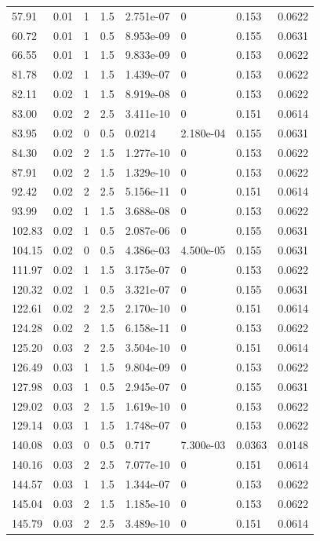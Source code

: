 \documentclass[preview]{standalone}
\begin{document}
{{\begin{tabular}{L{1.2cm}C{1.2cm} C{0.3cm}C{0.5cm} C{1.4cm}C{1.4cm} C{1.4cm}C{1.4cm}}
  57.91  &  0.01  & 1     & 1.5 &  2.751e-07  & 0  & 0.153 &  0.0622   \\ 
  60.72  &  0.01  & 1     & 0.5 &  8.953e-09  & 0  & 0.155 &  0.0631   \\ 
  66.55  &  0.01  & 1     & 1.5 &  9.833e-09  & 0  & 0.153 &  0.0622   \\ 
  81.78  &  0.02  & 1     & 1.5 &  1.439e-07  & 0  & 0.153 &  0.0622   \\ 
  82.11  &  0.02  & 1     & 1.5 &  8.919e-08  & 0  & 0.153 &  0.0622   \\ 
  83.00  &  0.02  & 2     & 2.5 &  3.411e-10  & 0  & 0.151 &  0.0614   \\ 
  83.95  &  0.02  & 0     & 0.5 &  0.0214  & 2.180e-04  & 0.155 &  0.0631   \\ 
  84.30  &  0.02  & 2     & 1.5 &  1.277e-10  & 0  & 0.153 &  0.0622   \\ 
  87.91  &  0.02  & 2     & 1.5 &  1.329e-10  & 0  & 0.153 &  0.0622   \\ 
  92.42  &  0.02  & 2     & 2.5 &  5.156e-11  & 0  & 0.151 &  0.0614   \\ 
  93.99  &  0.02  & 1     & 1.5 &  3.688e-08  & 0  & 0.153 &  0.0622   \\ 
  102.83  &  0.02  & 1     & 0.5 &  2.087e-06  & 0  & 0.155 &  0.0631   \\ 
  104.15  &  0.02  & 0     & 0.5 &  4.386e-03  & 4.500e-05  & 0.155 &  0.0631   \\ 
  111.97  &  0.02  & 1     & 1.5 &  3.175e-07  & 0  & 0.153 &  0.0622   \\ 
  120.32  &  0.02  & 1     & 0.5 &  3.321e-07  & 0  & 0.155 &  0.0631   \\ 
  122.61  &  0.02  & 2     & 2.5 &  2.170e-10  & 0  & 0.151 &  0.0614   \\ 
  124.28  &  0.02  & 2     & 1.5 &  6.158e-11  & 0  & 0.153 &  0.0622   \\ 
  125.20  &  0.03  & 2     & 2.5 &  3.504e-10  & 0  & 0.151 &  0.0614   \\ 
  126.49  &  0.03  & 1     & 1.5 &  9.804e-09  & 0  & 0.153 &  0.0622   \\ 
  127.98  &  0.03  & 1     & 0.5 &  2.945e-07  & 0  & 0.155 &  0.0631   \\ 
  129.02  &  0.03  & 2     & 1.5 &  1.619e-10  & 0  & 0.153 &  0.0622   \\ 
  129.14  &  0.03  & 1     & 1.5 &  1.748e-07  & 0  & 0.153 &  0.0622   \\ 
  140.08  &  0.03  & 0     & 0.5 &  0.717  & 7.300e-03  & 0.0363 &  0.0148   \\ 
  140.16  &  0.03  & 2     & 2.5 &  7.077e-10  & 0  & 0.151 &  0.0614   \\ 
  144.57  &  0.03  & 1     & 1.5 &  1.344e-07  & 0  & 0.153 &  0.0622   \\ 
  145.04  &  0.03  & 2     & 1.5 &  1.185e-10  & 0  & 0.153 &  0.0622   \\ 
  145.79  &  0.03  & 2     & 2.5 &  3.489e-10  & 0  & 0.151 &  0.0614   \\ 
\hline 
\end{tabular} 

}}
\end{document}
